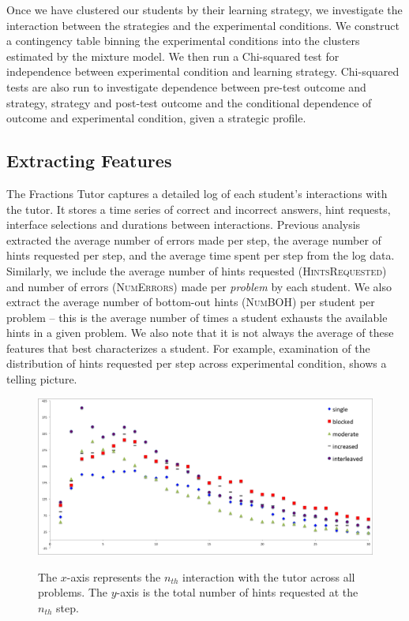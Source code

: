 \documentclass{edm_template}
\newcommand{\ftr}[1]{\textsc{#1}}
\begin{document}
Once we have clustered our students by their learning strategy, we investigate the interaction between the strategies and the experimental conditions. We construct a contingency table binning the experimental conditions into the clusters estimated by the mixture model. We then run a Chi-squared test for independence between experimental condition and learning strategy. Chi-squared tests are also run to investigate dependence between pre-test outcome and strategy, strategy and post-test outcome and the conditional dependence of outcome and experimental condition, given a strategic profile.

\subsection{Extracting Features}
The Fractions Tutor captures a detailed log of each student's interactions with the tutor. It stores a time series of correct and incorrect answers, hint requests, interface selections and durations between interactions. Previous analysis \cite{Rau2012} extracted the average number of errors made per step, the average number of hints requested per step, and the average time spent per step from the log data. Similarly, we include the average number of hints requested (\ftr{HintsRequested}) and number of errors (\ftr{NumErrors}) made per \emph{problem} by each student. We also extract the average number of bottom-out hints (\ftr{NumBOH}) per student per problem -- this is the average number of times a student exhausts the available hints in a given problem. We also note that it is not always the average of these features that best characterizes a student. For example, examination of the distribution of hints requested per step across experimental condition, shows a telling picture.
\begin{figure}[t!]
\centering
\includegraphics[scale=.48]{hintsByStep2.png}\\
\caption{The $x$-axis represents the $n_{th}$ interaction with the tutor across all problems. The $y$-axis is the total number of hints requested at the $n_{th}$ step.  }
\label{fig:hints-geom}
\end{figure}
\end{document}
